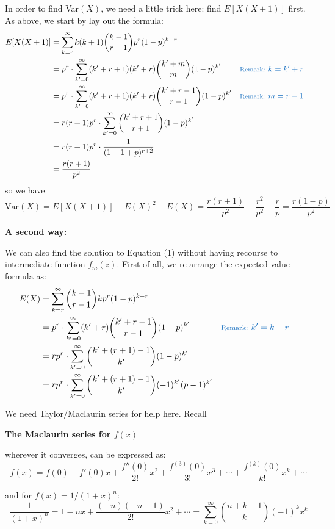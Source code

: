 \documentclass[11pt]{article}
\begin{document}
In order to find Var$(X)$,  we need a little trick here: find $E[X (X+1)]$ first.  As above,  we start by lay out the formula:
\[
\begin{aligned}
E[X(X+1)] 
	&= \sum _{k=r} ^\infty k(k+1) \binom {k-1}{r-1}  p^r (1-p)^{k-r} \\
	&= p^r \cdot  \sum _{k'=0} ^\infty (k'+r+1)(k' + r)  \binom {k' + m}{m}  (1-p)^{k'}  && \color{RoyalBlue}  \text{\footnotesize Remark: } k=k'+r\\
	&=  p^r \cdot  \sum _{k'=0} ^\infty (k'+r+1)(k' + r)  \binom {k' + r -1}{r-1}  (1-p)^{k'}  && \color{RoyalBlue}  \text{\footnotesize Remark: } m=r-1 \\
	&= r (r+1) p^r   \cdot  \sum _{k'=0} ^\infty  \binom {k' + r +1}{r+1}  (1-p)^{k'}  \\
	&= r (r+1) p^r \cdot \frac{1}{(1-1+p)^{r+2} } \\
	&= \frac{r(r+1)}{p^2} \\
\end{aligned}
\]
so we have
\[
\text{Var}(X) = E[X(X+1)] - E(X)^2 - E(X)= \frac{r(r+1)}{p^2} - \frac{r^2}{p^2} - \frac{r}{p}=\frac{r(1-p)}{p^2}
\]


\textbf{A second way:}

We can also find the solution to Equation (1) without having recourse to intermediate function $f_m(z)$.  First of all,  we re-arrange the expected value formula as:
\[
\begin{aligned}
E(X) 
	&= \sum _{k=r} ^\infty \binom {k-1}{r-1} k p^r (1-p)^{k-r} \\
	&= p^r \cdot  \sum _{k'=0} ^\infty (k'+r)  \binom {k' + r-1}{r-1}  (1-p)^{k'} && \color{RoyalBlue}  \text{\footnotesize Remark: } k'=k-r\\
	&= r p^r \cdot \sum _{k'=0} ^\infty  \binom {k' + (r+1) -1}{k'}  (1-p)^{k'} \\
	&= r p^r \cdot \sum _{k'=0} ^\infty  \binom {k' + (r+1) -1}{k'}  (-1)^{k'} (p-1)^{k'} \\
\end{aligned}
\]


We need Taylor/Maclaurin series for help here.  Recall


\begin{tcolorbox}[
	enhanced, 
	width=\textwidth, 
	fontupper=\normalsize,%
	drop fuzzy shadow southwest,
	boxrule=0.4pt,
	sharp corners,
	colframe=yellow!80!black,
	colback=yellow!10]
	
\textbf{\color{RoyalBlue} The Maclaurin series for $f(x)$}  

wherever it converges, can be expressed as: 
\[ 
f(x) = f(0) + f'(0)x + \frac{f''(0)}{2!}x^2 + \frac{f^{(3)} (0)}{3!}x^3 + \cdots +  \frac{f^{(k)} (0)}{k!}x^k + \cdots
\]

and for $f(x) = 1/(1+x)^n$: 
\[
\frac{1}{(1+x)^n} = 1 - nx + \frac{(-n)(-n-1)}{2!} x^2 + \cdots = \sum _{k=0} ^\infty \binom {n+k-1} {k} (-1)^k x^k
\]


\end{tcolorbox}
\end{document}
